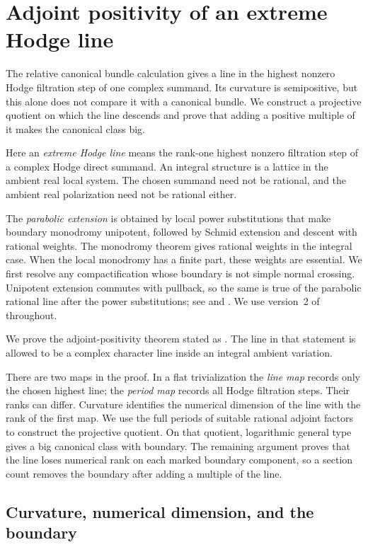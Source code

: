 \section{Adjoint positivity of an extreme Hodge line}
\label{period:section}

The relative canonical bundle calculation gives a line in the highest
nonzero Hodge filtration step of one complex summand.  Its curvature
is semipositive, but this alone does not compare it with a canonical
bundle.  We construct a projective quotient on which the line descends
and prove that adding a positive multiple of it makes the canonical
class big.

Here an \emph{extreme Hodge line} means the rank-one highest nonzero
filtration step of a complex Hodge direct summand.  An integral
structure is a lattice in the ambient real local system.  The chosen
summand need not be rational, and the ambient real polarization need
not be rational either.

The \emph{parabolic extension} is obtained by local power substitutions
that make boundary monodromy unipotent, followed by Schmid extension
and descent with rational weights.  The monodromy theorem gives
rational weights in the integral case.  When the local monodromy has
a finite part, these weights are essential.  We first resolve any
compactification whose boundary is not simple normal crossing.
Unipotent extension commutes with pullback, so the same is true of
the parabolic rational line after the power substitutions; see
\cite{Schmid,CKS} and \cite[Lemma~5.6]{BFMT}.  We use version~2
of \cite{BFMT} throughout.


We prove the adjoint-positivity theorem stated as
. The line in that statement is allowed to be a
complex character line inside an integral ambient variation.

There are two maps in the proof.  In a flat trivialization the
\emph{line map} records only the chosen highest line; the \emph{period
map} records all Hodge filtration steps.  Their ranks can differ.
Curvature identifies the numerical dimension of the line with the
rank of the first map.  We use the full periods of suitable rational
adjoint factors to construct the projective quotient.  On that
quotient, logarithmic general type gives a big canonical class with
boundary.  The remaining argument proves that the line loses numerical
rank on each marked boundary component, so a section count removes
the boundary after adding a multiple of the line.

\subsection{Curvature, numerical dimension, and the boundary}

